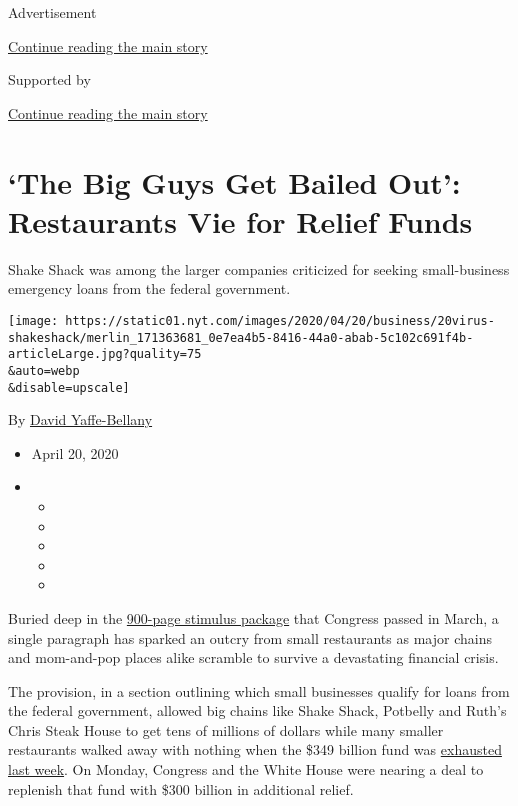 Advertisement

\protect\hyperlink{after-top}{Continue reading the main story}

Supported by

\protect\hyperlink{after-sponsor}{Continue reading the main story}

\hypertarget{the-big-guys-get-bailed-out-restaurants-vie-for-relief-funds}{%
\section{`The Big Guys Get Bailed Out': Restaurants Vie for Relief
Funds}\label{the-big-guys-get-bailed-out-restaurants-vie-for-relief-funds}}

Shake Shack was among the larger companies criticized for seeking
small-business emergency loans from the federal government.

\texttt{[image: https://static01.nyt.com/images/2020/04/20/business/20virus-shakeshack/merlin\_171363681\_0e7ea4b5-8416-44a0-abab-5c102c691f4b-articleLarge.jpg?quality=75\\\&auto=webp\\\&disable=upscale]}

By \href{http://www.nytimes.com/by/david-yaffe-bellany}{David
Yaffe-Bellany}

\begin{itemize}
\item
  April 20, 2020
\item
  \begin{itemize}
  \item
  \item
  \item
  \item
  \item
  \end{itemize}
\end{itemize}

Buried deep in the
\href{https://assets.documentcloud.org/documents/20059055/final-final-cares-act.pdf}{900-page
stimulus package} that Congress passed in March, a single paragraph has
sparked an outcry from small restaurants as major chains and mom-and-pop
places alike scramble to survive a devastating financial crisis.

The provision, in a section outlining which small businesses qualify for
loans from the federal government, allowed big chains like Shake Shack,
Potbelly and Ruth's Chris Steak House to get tens of millions of dollars
while many smaller restaurants walked away with nothing when the \$349
billion fund was
\href{https://www.nytimes.com/2020/04/16/business/coronavirus-sba-loans-out-of-money.html}{exhausted
last week}. On Monday, Congress and the White House were nearing a deal
to replenish that fund with \$300 billion in additional relief.

